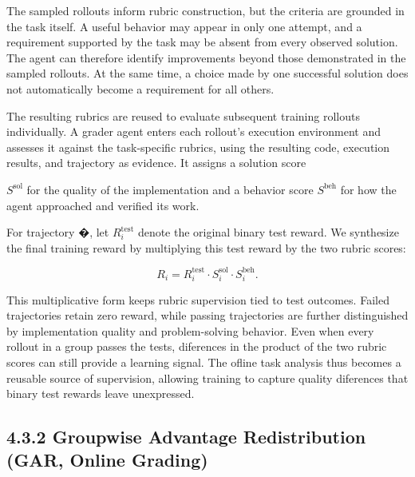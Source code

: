 \documentclass[
  10
]{article}
\begin{document}
The sampled rollouts inform rubric construction, but the criteria are
grounded in the task itself. A useful behavior may appear in only one
attempt, and a requirement supported by the task may be absent from
every observed solution. The agent can therefore identify improvements
beyond those demonstrated in the sampled rollouts. At the same time, a
choice made by one successful solution does not automatically become a
requirement for all others.

The resulting rubrics are reused to evaluate subsequent training
rollouts individually. A grader agent enters each rollout's execution
environment and assesses it against the task-specific rubrics, using the
resulting code, execution results, and trajectory as evidence. It
assigns a solution score

\(S ^ { \mathrm { s o l } }\) for the quality of the implementation and
a behavior score \(S ^ { \mathrm { b e h } }\) for how the agent
approached and verified its work.

For trajectory �, let \(R _ { i } ^ { \mathrm { t e s t } }\) denote the
original binary test reward. We synthesize the final training reward by
multiplying this test reward by the two rubric scores:

\[
R _ {i} = R _ {i} ^ {\mathrm{test}} \cdot S _ {i} ^ {\mathrm{sol}} \cdot S _ {i} ^ {\mathrm{beh}}.\tag{2}
\]

This multiplicative form keeps rubric supervision tied to test outcomes.
Failed trajectories retain zero reward, while passing trajectories are
further distinguished by implementation quality and problem-solving
behavior. Even when every rollout in a group passes the tests,
diferences in the product of the two rubric scores can still provide a
learning signal. The ofline task analysis thus becomes a reusable source
of supervision, allowing training to capture quality diferences that
binary test rewards leave unexpressed.

\subsection{4.3.2 Groupwise Advantage Redistribution (GAR, Online
Grading)}\label{groupwise-advantage-redistribution-gar-online-grading}
\end{document}
